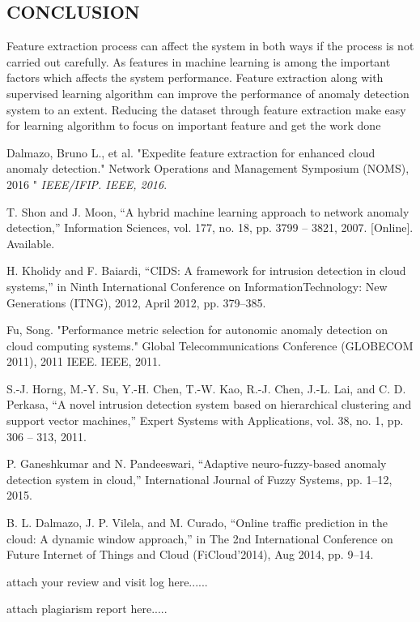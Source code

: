 \documentclass[a4paper, 12pt]{article}
\begin{document}
\newpage
\begin{center}
\section{CONCLUSION}
\end{center}
\par
Feature extraction process can affect the system in both ways if the process is not carried out carefully. As features in machine learning is among the important factors which affects the system performance. Feature extraction along with supervised learning algorithm can improve the performance of anomaly detection system to an extent. Reducing the dataset through feature extraction make easy for learning algorithm to focus on important feature and get the work done  
\\

\newpage
%
%


\begin{thebibliography}{21}
 Dalmazo, Bruno L., et al. "Expedite feature extraction for enhanced 	cloud anomaly detection." Network Operations and Management 	Symposium (NOMS), 2016 " \textit{IEEE/IFIP. IEEE, 2016}.

 T. Shon and J. Moon, “A hybrid machine learning approach to 	network anomaly detection,” Information Sciences, vol. 177, no. 18, 	pp. 3799 – 3821, 2007. [Online]. Available.

 H. Kholidy and F. Baiardi, “CIDS: A framework for intrusion 	detection in cloud systems,” in Ninth International Conference on 	InformationTechnology: New Generations (ITNG), 2012, April 2012, 	pp. 379–385.

 Fu, Song. "Performance metric selection for autonomic anomaly 	detection on cloud computing systems." Global Telecommunications 	Conference (GLOBECOM 2011), 2011 IEEE. IEEE, 2011.

 S.-J. Horng, M.-Y. Su, Y.-H. Chen, T.-W. Kao, R.-J. Chen, J.-L. Lai,	and C. D. Perkasa, “A novel intrusion detection system based on 	hierarchical clustering and support vector machines,” Expert Systems 	with Applications, vol. 38, no. 1, pp. 306 – 313, 2011.


 P. Ganeshkumar and N. Pandeeswari, “Adaptive neuro-fuzzy-based 	anomaly detection system in cloud,” International Journal of Fuzzy 	Systems, pp. 1–12, 2015.


B. L. Dalmazo, J. P. Vilela, and M. Curado, “Online traffic prediction 	in the cloud: A dynamic window approach,” in The 2nd International 	Conference on Future Internet of Things and Cloud (FiCloud’2014), 	Aug 2014, pp. 9–14.



\end{thebibliography}

\newpage

attach your review and visit log here......

\newpage

attach  plagiarism report here.....
\end{document}

